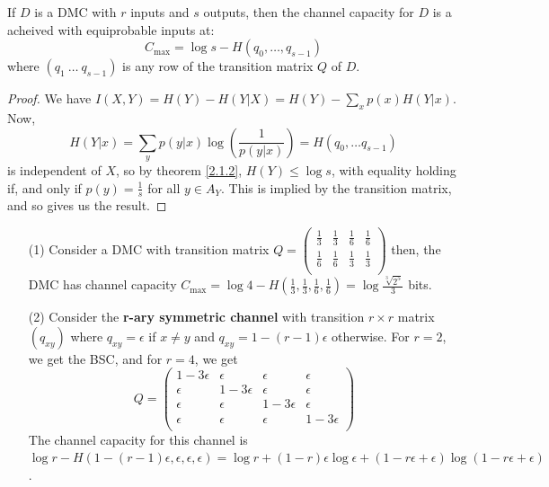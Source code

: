 \begin{theorem}\label{3.1.6}
    If $D$ is a DMC with  $r$ inputs and  $s$ outputs, then the channel capacity
    for  $D$ is a acheived with equiprobable inputs at:
    \begin{equation}
        C_{\max}=\log{s}-H(q_0, \dots, q_{s-1})
    \end{equation}
    where $(q_1 \ \dots \ q_{s-1})$ is any row of the transition matrix $Q$ of $D$.
\end{theorem}
\begin{proof}
    We have $I(X,Y)=H(Y)-H(Y|X)=H(Y)-\sum_{x}{p(x)H(Y|x)}$. Now,
    \begin{equation*}
        H(Y|x)=\sum_{y}{p(y|x)\log(\frac{1}{p(y|x)})}=H(q_0, \dots q_{s-1})
    \end{equation*}
    is independent of $X$, so by theorem \ref {2.1.2}, $H(Y) \leq \log{s}$, with
    equality holding if, and only if $p(y)=\frac{1}{s}$ for all $y \in A_Y$.
    This is implied by the transition matrix, and so gives us the result.
\end{proof}

\begin{example}
       \begin{enumerate}
           \item[(1)] Consider a DMC with transition matrix
            $Q=\begin{pmatrix}
                    \frac{1}{3} & \frac{1}{3} & \frac{1}{6} & \frac{1}{6} \\
                    \frac{1}{6} & \frac{1}{6} & \frac{1}{3} & \frac{1}{3} \\
               \end{pmatrix}$
            then, the DMC has channel capacity $C_{\max}=\log{4}-H(\frac{1}{3},
            \frac{1}{3}, \frac{1}{6}, \frac{1}{6})=\log{\frac{\sqrt[3]{2^5}}{3}}$
            bits.

        \item[(2)] Consider the \textbf{r-ary symmetric channel} with transition
            $r \times r$ matrix $(q_{xy})$ where $q_{xy}=\epsilon$ if $x \neq y$
            and  $q_{xy}=1-(r-1)\epsilon$ otherwise. For $r=2$, we get the BSC,
            and for $r=4$, we get
            \begin{equation*}
                Q=\begin{pmatrix}
                    1-3\epsilon & \epsilon & \epsilon & \epsilon \\
                    \epsilon & 1-3\epsilon & \epsilon & \epsilon \\
                    \epsilon & \epsilon & 1-3\epsilon & \epsilon \\
                    \epsilon & \epsilon & \epsilon & 1-3\epsilon \\
                  \end{pmatrix}
            \end{equation*}
            The channel capacity for this channel is $\log{r}-H(1-(r-1)\epsilon,
            \epsilon, \epsilon, \epsilon)=\log{r}+(1-r)\epsilon\log{\epsilon}+
            (1-r\epsilon+\epsilon)\log{(1-r\epsilon+\epsilon)}$.
       \end{enumerate}
\end{example}
